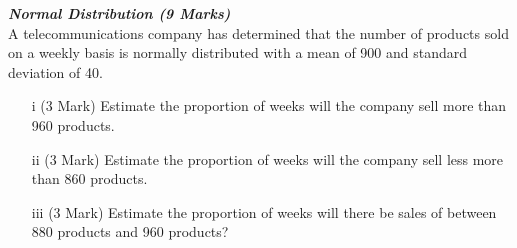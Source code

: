 

\item[(b)] \textbf{\textit{Normal Distribution (9 Marks)}}\\ %
 A telecommunications company has determined that the number of products sold on a weekly basis is normally distributed with a mean of 900 and standard deviation of 40.
\begin{itemize}
\item[i] (3 Mark) Estimate the proportion of weeks will the company sell more than 960 products.

\item[ii] (3 Mark) Estimate the proportion of weeks will the company sell less more than 860 products.
\item[iii] (3 Mark) Estimate the proportion of weeks will there be sales of between 880
products and 960 products?
\end{itemize}

